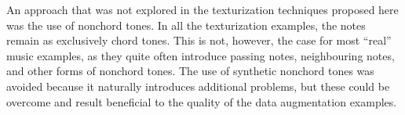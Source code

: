 
An approach that was not explored in the texturization
techniques proposed here was the use of nonchord tones. In
all the texturization examples, the notes remain as
exclusively chord tones. This is not, however, the case for
most ``real'' music examples, as they quite often introduce
passing notes, neighbouring notes, and other forms of
nonchord tones. The use of synthetic nonchord tones was
avoided because it naturally introduces additional problems,
but these could be overcome and result beneficial to the
quality of the data augmentation examples.
